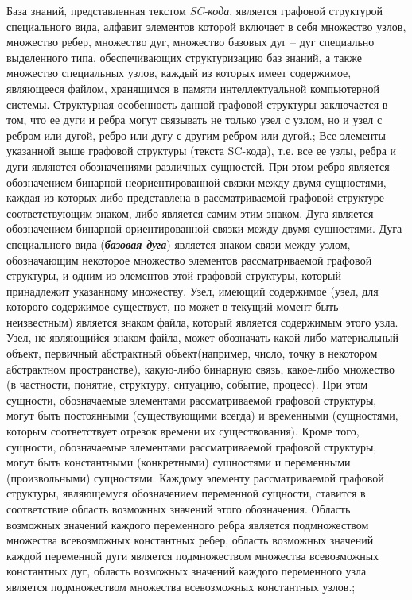 \begin{SCn}
{База знаний, представленная текстом \textit{SC-кода}, является графовой структурой специального вида, алфавит элементов которой включает в себя множество узлов, множество ребер, множество дуг, множество базовых дуг -- дуг специально выделенного типа, обеспечивающих структуризацию баз знаний, а также множество специальных узлов, каждый из которых имеет содержимое, являющееся файлом, хранящимся в памяти интеллектуальной компьютерной системы. Структурная особенность данной графовой структуры заключается в том, что ее дуги и ребра могут связывать не только узел с узлом, но и узел с ребром или дугой, ребро или дугу с другим ребром или дугой.;
\uline{Все элементы} указанной выше графовой структуры (текста SC-кода), т.е. все ее узлы, ребра и дуги являются обозначениями различных сущностей. При этом ребро является обозначением бинарной неориентированной связки между двумя сущностями, каждая из которых либо представлена в рассматриваемой графовой структуре соответствующим знаком, либо является самим этим знаком. Дуга является обозначением бинарной ориентированной связки между двумя сущностями. Дуга специального вида (\textit{\textbf{базовая дуга}}) является знаком связи между узлом, обозначающим некоторое множество элементов рассматриваемой графовой структуры, и одним из элементов этой графовой структуры, который принадлежит указанному множеству. Узел, имеющий содержимое (узел, для которого содержимое существует, но может в текущий момент быть неизвестным) является знаком файла, который является содержимым этого узла. Узел, не являющийся знаком файла, может обозначать какой-либо материальный объект, первичный абстрактный объект(например, число, точку в некотором абстрактном пространстве), какую-либо бинарную связь, какое-либо множество (в частности, понятие, структуру, ситуацию, событие, процесс). При этом сущности, обозначаемые элементами рассматриваемой графовой структуры, могут быть постоянными (существующими всегда) и временными (сущностями, которым соответствует отрезок времени их существования). Кроме того, сущности, обозначаемые элементами рассматриваемой графовой структуры, могут быть константными (конкретными) сущностями и переменными (произвольными) сущностями. Каждому элементу рассматриваемой графовой структуры, являющемуся обозначением переменной сущности, ставится в соответствие область возможных значений этого обозначения. Область возможных значений каждого переменного ребра является подмножеством множества всевозможных константных ребер, область возможных значений каждой переменной дуги является подмножеством множества всевозможных константных дуг, область возможных значений каждого переменного узла является подмножеством множества всевозможных константных узлов.;
}
\end{SCn}
